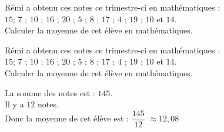 \begin{exercice*}[Notes]
    Rémi a obtenu ces notes ce trimestre-ci en mathématiques :\\
    $15$; $7$ ; $10$ ; $16$ ; $20$ ; $5$ ; $8$ ; $17$ ; $4$ ; $19$ ; $10$ et $14$.\\
    Calculer la moyenne de cet élève en mathématiques.

\end{exercice*}
\begin{corrige}
        Rémi a obtenu ces notes ce trimestre-ci en mathématiques :\\
    $15$; $7$ ; $10$ ; $16$ ; $20$ ; $5$ ; $8$ ; $17$ ; $4$ ; $19$ ; $10$ et $14$.\\
    Calculer la moyenne de cet élève en mathématiques.
    {\red
    \begin{spacing}{1.5}
        La somme des notes est : $145$.\\
         Il y a $12$ notes.\\
        Donc la moyenne de cet élève est : $\dfrac{145}{12}$ $\approx12{,}08$
    \end{spacing}
    }
\end{corrige}

